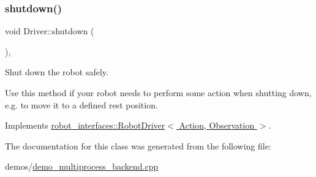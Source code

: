 \subsubsection{\texorpdfstring{shutdown()}{shutdown()}}
{\footnotesize\ttfamily void Driver\+::shutdown (\begin{DoxyParamCaption}{ }\end{DoxyParamCaption})\hspace{0.3cm}{\ttfamily [inline]}, {\ttfamily [virtual]}}



Shut down the robot safely. 

Use this method if your robot needs to perform some action when shutting down, e.\+g. to move it to a defined rest position. 

Implements \hyperlink{classrobot__interfaces_1_1RobotDriver_a3451fb8b15d2840b559f3ee858de01f8}{robot\+\_\+interfaces\+::\+Robot\+Driver$<$ Action, Observation $>$}.



The documentation for this class was generated from the following file\+:\begin{DoxyCompactItemize}
\item 
demos/\hyperlink{demo__multiprocess__backend_8cpp}{demo\+\_\+multiprocess\+\_\+backend.\+cpp}\end{DoxyCompactItemize}
